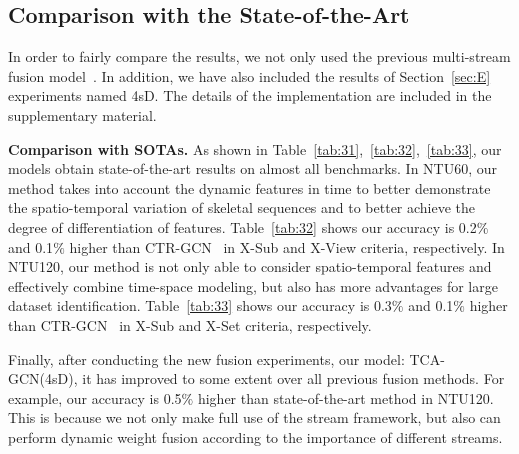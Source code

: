 \documentclass[letterpaper]{article} \usepackage[submission]{aaai23}  \usepackage{times}  \usepackage{helvet}  \usepackage{courier}  \usepackage[hyphens]{url}  \usepackage{graphicx} \urlstyle{rm} \def\UrlFont{\rm}  \usepackage{natbib}  \usepackage{caption} \frenchspacing  \setlength{\pdfpagewidth}{8.5in} \setlength{\pdfpageheight}{11in} \usepackage{algorithm}
\begin{document}
\subsection{Comparison with the State-of-the-Art}
\label{sec:CA}
In order to fairly compare the results, we not only used the previous multi-stream fusion model~\cite{2021Channel,DBLP:conf/cvpr/Cheng0HC0L20,2020Dynamic}. In addition, we have also included the results of Section~\ref{sec:E} experiments named 4sD. The details of the implementation are included in the supplementary material. 

\noindent
{\bf Comparison with SOTAs.} As shown in Table~\ref{tab:31},~\ref{tab:32},~\ref{tab:33}, our models obtain state-of-the-art results on almost all benchmarks. In NTU60, our method takes into account the dynamic features in time to better demonstrate the spatio-temporal variation of skeletal sequences and to better achieve the degree of differentiation of features.
Table~\ref{tab:32} shows our accuracy is 0.2$\%$ and 0.1$\%$ higher than CTR-GCN~\cite{2021Channel} in X-Sub and X-View criteria, respectively.
In NTU120, our method is not only able to consider spatio-temporal features and effectively combine time-space modeling, but also has more advantages for large dataset identification. Table~\ref{tab:33} shows our accuracy is 0.3$\%$ and 0.1$\%$ higher than CTR-GCN~\cite{2021Channel} in X-Sub and X-Set criteria, respectively.


Finally, after conducting the new fusion experiments, our model: TCA-GCN(4sD), it has improved to some extent over all previous fusion methods. For example, our accuracy is 0.5$\%$ higher than state-of-the-art method in NTU120. This is because we not only make full use of the stream framework, but also can perform dynamic weight fusion according to the importance of different streams.
\end{document}
